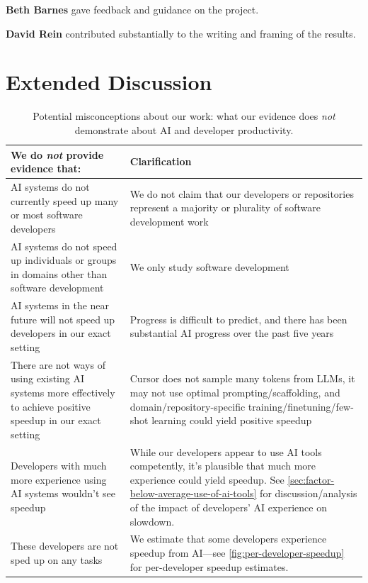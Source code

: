 \documentclass{article}
\begin{document}
\textbf{Beth Barnes} gave feedback and guidance on the project.

\textbf{David Rein} contributed substantially to the writing and framing of the results.


\section{Extended Discussion}
\label{sec:extended_discussion}

\begin{table}[h]
    \centering
    \renewcommand{\arraystretch}{1.3}
    \begin{tabular}{p{6cm} p{7cm}}
        \toprule
        \textbf{We do \textit{not} provide evidence that:} & \textbf{Clarification} \\
        \midrule
        
        AI systems do not currently speed up many or most software developers & 
        We do not claim that our developers or repositories represent a majority or plurality of software development work \\
        \midrule
        
        AI systems do not speed up individuals or groups in domains other than software development & 
        We only study software development \\
        \midrule
        
        AI systems in the near future will not speed up developers in our exact setting & 
        Progress is difficult to predict, and there has been substantial AI progress over the past five years \cite{kwa2025measuringai} \\
        \midrule
        
        There are not ways of using existing AI systems more effectively to achieve positive speedup in our exact setting & 
        Cursor does not sample many tokens from LLMs, it may not use optimal prompting/scaffolding, and domain/repository-specific training/finetuning/few-shot learning could yield positive speedup \\
        \midrule

        Developers with much more experience using AI systems wouldn't see speedup & While our developers appear to use AI tools competently, it's plausible that much more experience could yield speedup. See \autoref{sec:factor-below-average-use-of-ai-tools} for discussion/analysis of the impact of developers' AI experience on slowdown. \\
        \midrule

        These developers are not sped up on any tasks & We estimate that some developers experience speedup from AI---see \autoref{fig:per-developer-speedup} for per-developer speedup estimates. \\


        \bottomrule
    \end{tabular}
    \vspace{1em}
    \caption{Potential misconceptions about our work: what our evidence does \textit{not} demonstrate about AI and developer productivity.}
    \label{tab:potential_misconceptions}
\end{table}
\end{document}
